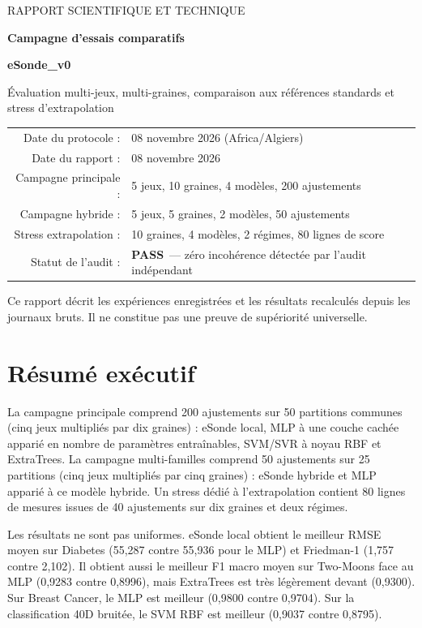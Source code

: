 \documentclass[11pt,a4paper]{article}
\newcommand{\PASS}{\textcolor{green!45!black}{\textbf{PASS}}}
\begin{document}
\begin{titlepage}\centering\vspace*{18mm}
{\Large RAPPORT SCIENTIFIQUE ET TECHNIQUE\par}\vspace{10mm}
{\Huge\bfseries Campagne d'essais comparatifs\par}\vspace{4mm}
{\LARGE\bfseries eSonde\_v0\par}\vspace{12mm}
{\large Évaluation multi-jeux, multi-graines, comparaison aux références standards et stress d'extrapolation\par}
\vfill
\begin{tabular}{rl}
Date du protocole : & 08 novembre 2026 (Africa/Algiers)\\
Date du rapport : & 08 novembre 2026\\
Campagne principale : & 5 jeux, 10 graines, 4 modèles, 200 ajustements\\
Campagne hybride : & 5 jeux, 5 graines, 2 modèles, 50 ajustements\\
Stress extrapolation : & 10 graines, 4 modèles, 2 régimes, 80 lignes de score\\
Statut de l'audit : & \PASS\ — zéro incohérence détectée par l'audit indépendant\\
\end{tabular}
\vfill
{\small Ce rapport décrit les expériences enregistrées et les résultats recalculés depuis les journaux bruts. Il ne constitue pas une preuve de supériorité universelle.\par}
\end{titlepage}
\tableofcontents\newpage

\section{Résumé exécutif}
La campagne principale comprend 200 ajustements sur 50 partitions communes (cinq jeux multipliés par dix graines) : eSonde local, MLP à une couche cachée apparié en nombre de paramètres entraînables, SVM/SVR à noyau RBF et ExtraTrees. La campagne multi-familles comprend 50 ajustements sur 25 partitions (cinq jeux multipliés par cinq graines) : eSonde hybride et MLP apparié à ce modèle hybride. Un stress dédié à l'extrapolation contient 80 lignes de mesures issues de 40 ajustements sur dix graines et deux régimes.

Les résultats ne sont pas uniformes. eSonde local obtient le meilleur RMSE moyen sur Diabetes (55,287 contre 55,936 pour le MLP) et Friedman-1 (1,757 contre 2,102). Il obtient aussi le meilleur F1 macro moyen sur Two-Moons face au MLP (0,9283 contre 0,8996), mais ExtraTrees est très légèrement devant (0,9300). Sur Breast Cancer, le MLP est meilleur (0,9800 contre 0,9704). Sur la classification 40D bruitée, le SVM RBF est meilleur (0,9037 contre 0,8795).
\end{document}
